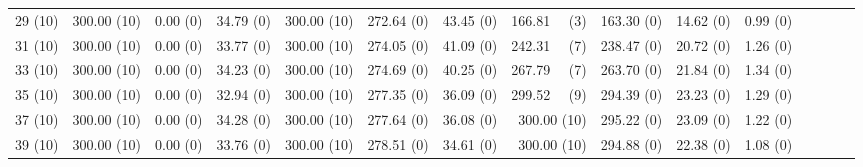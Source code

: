 \documentclass[11pt,fleqn,twoside]{article}
\begin{document}
{\begin{table}[t]
\begin{tabular}[t]{|r|r|r|r|r|r|r|r|r|r|r|r|r|r|r|}
29 (10) & 300.00 (10) & 0.00 (0) & 34.79 (0) & 300.00 (10) & 272.64 (0) & 43.45 (0) & 166.81 ~~(3) & 163.30 (0) & 14.62 (0) & 0.99 (0) \\
31 (10) & 300.00 (10) & 0.00 (0) & 33.77 (0) & 300.00 (10) & 274.05 (0) & 41.09 (0) & 242.31 ~~(7) & 238.47 (0) & 20.72 (0) & 1.26 (0) \\
33 (10) & 300.00 (10) & 0.00 (0) & 34.23 (0) & 300.00 (10) & 274.69 (0) & 40.25 (0) & 267.79 ~~(7) & 263.70 (0) & 21.84 (0) & 1.34 (0) \\
35 (10) & 300.00 (10) & 0.00 (0) & 32.94 (0) & 300.00 (10) & 277.35 (0) & 36.09 (0) & 299.52 ~~(9) & 294.39 (0) & 23.23 (0) & 1.29 (0) \\
37 (10) & 300.00 (10) & 0.00 (0) & 34.28 (0) & 300.00 (10) & 277.64 (0) & 36.08 (0) & 300.00 (10) & 295.22 (0) & 23.09 (0) & 1.22 (0) \\
39 (10) & 300.00 (10) & 0.00 (0) & 33.76 (0) & 300.00 (10) & 278.51 (0) & 34.61 (0) & 300.00 (10) & 294.88 (0) & 22.38 (0) & 1.08 (0) \\
%

\end{tabular}
\end{table}}
\end{document}
